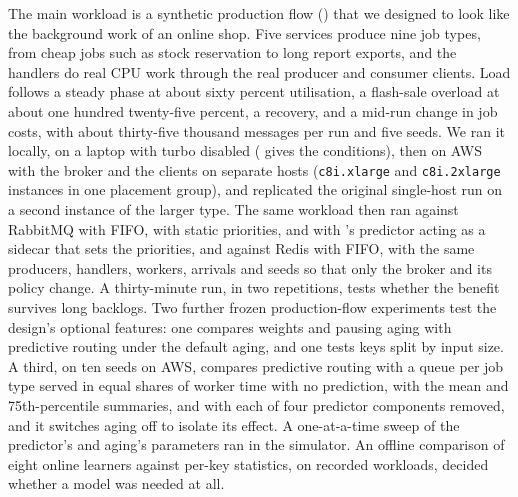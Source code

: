 The main workload is a synthetic production flow () that we designed to look like the background work of an online shop. Five
services produce nine job types, from cheap jobs such as stock reservation to long report exports, and
the handlers do real CPU work through the real producer and consumer clients. Load follows a steady phase at about
sixty percent utilisation, a flash-sale overload at about one hundred twenty-five percent, a recovery, and a mid-run change
in job costs, with about thirty-five thousand messages per run and five seeds. We ran it locally, on a laptop with turbo disabled ( gives the conditions), then on AWS with the
broker and the clients on separate hosts (\texttt{c8i.xlarge} and \texttt{c8i.2xlarge} instances in one placement group),
and replicated the original single-host run on a second instance of the larger type. The same workload then ran against
RabbitMQ with FIFO, with static priorities, and with \sys{}'s predictor acting as a sidecar that sets the priorities, and
against Redis with FIFO, with the same producers, handlers, workers, arrivals and seeds so that only the broker and its
policy change. A thirty-minute run, in two repetitions, tests whether the benefit survives long backlogs. Two further frozen production-flow experiments test the design's optional features: one compares weights and pausing aging with predictive routing under the default aging, and one tests keys split by input size. A third, on ten seeds on AWS, compares predictive routing with a queue per job type served in equal shares of worker time with no prediction, with the mean and 75th-percentile summaries, and with each of four predictor components removed, and it switches aging off to isolate its effect. A one-at-a-time sweep of the predictor's and aging's parameters ran in the simulator. An offline comparison of eight online learners against per-key statistics, on recorded workloads, decided whether a model was needed at all.



